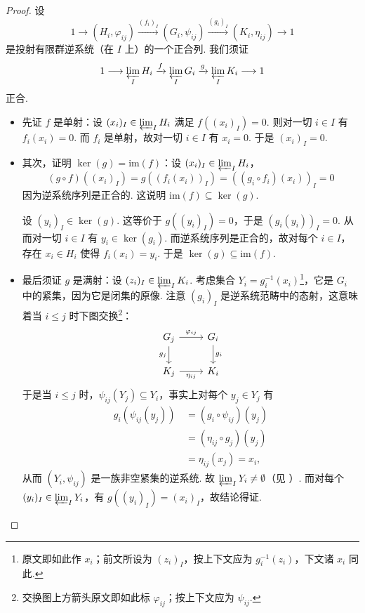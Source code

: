 \begin{proof}
设
\[
1\longrightarrow(H_i,\varphi_{ij})\xrightarrow{(f_i)_I}(G_i,\psi_{ij})\xrightarrow{(g_i)_I}(K_i,\eta_{ij})\longrightarrow 1
\]
是投射有限群逆系统（在 $I$ 上）的一个正合列. 我们须证
\[
1\longrightarrow{\varprojlim_I}\,H_i\xrightarrow{f}{\varprojlim_I}\,G_i\xrightarrow{g}{\varprojlim_I}\,K_i\longrightarrow 1
\]
正合.
\begin{itemize}
    \item 先证 $f$ 是单射：设 $(x_i)_I\in{\varprojlim_I}\,H_i$ 满足 $f((x_i)_I)=0$. 则对一切 $i\in I$ 有 $f_i(x_i)=0$. 而 $f_i$ 是单射，故对一切 $i\in I$ 有 $x_i=0$. 于是 $(x_i)_I=0$.
    \item 其次，证明 $\ker(g)=\mathrm{im}(f)$：设 $(x_i)_I\in{\varprojlim_I}\,H_i$，
    \[
    (g\circ f)((x_i)_I)=g((f_i(x_i))_I)=((g_i\circ f_i)(x_i))_I=0
    \]
    因为逆系统序列是正合的. 这说明 $\mathrm{im}(f)\subseteq\ker(g)$.

    设 $(y_i)_I\in\ker(g)$. 这等价于 $g((y_i)_I)=0$，于是 $(g_i(y_i))_I=0$. 从而对一切 $i\in I$ 有 $y_i\in\ker(g_i)$. 而逆系统序列是正合的，故对每个 $i\in I$，存在 $x_i\in H_i$ 使得 $f_i(x_i)=y_i$. 于是 $\ker(g)\subseteq\mathrm{im}(f)$.
    \item 最后须证 $g$ 是满射：设 $(z_i)_I\in{\varprojlim_I}\,K_i$. 考虑集合 $Y_i=g_i^{-1}(x_i)$\footnote{原文即如此作 $x_i$；前文所设为 $(z_i)_I$，按上下文应为 $g_i^{-1}(z_i)$，下文诸 $x_i$ 同此.}，它是 $G_i$ 中的紧集，因为它是闭集的原像. 注意 $(g_i)_I$ 是逆系统范畴中的态射，这意味着当 $i\leq j$ 时下图交换\footnote{交换图上方箭头原文即如此标 $\varphi_{ij}$；按上下文应为 $\psi_{ij}$.}：
    \[
    \begin{tikzcd}
    G_j \arrow[r, "\varphi_{ij}"] \arrow[d, "g_j"'] & G_i \arrow[d, "g_i"] \\
    K_j \arrow[r, "\eta_{ij}"'] & K_i
    \end{tikzcd}
    \]
    于是当 $i\leq j$ 时，$\psi_{ij}(Y_j)\subseteq Y_i$，事实上对每个 $y_j\in Y_j$ 有
    \[
    \begin{aligned}
    g_i(\psi_{ij}(y_j))\,&=(g_i\circ\psi_{ij})(y_j)\\
    &=(\eta_{ij}\circ g_j)(y_j)\\
    &=\eta_{ij}(x_j)=x_i,
    \end{aligned}
    \]
    从而 $(Y_i,\psi_{ij})$ 是一族非空紧集的逆系统. 故 ${\varprojlim_I}\,Y_i\neq\emptyset$（见 \cite[Proposition~8, \S9, Chapter~1]{bou71}）. 而对每个 $(y_i)_I\in{\varprojlim_I}\,Y_i$，有 $g((y_i)_I)=(x_i)_I$，故结论得证.
\end{itemize}
\end{proof}

